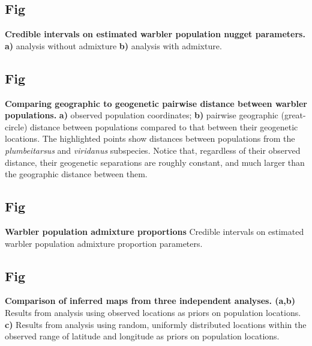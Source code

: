 \documentclass[10pt,letterpaper]{article}
\begin{document}
\subsection{Fig}
\label{sfig:warb_pop_nugg}
{\bf{
Credible intervals on estimated warbler population nugget parameters.}} 
\textbf{a)} analysis without admixture
\textbf{b)} analysis with admixture.

\subsection{Fig}
\label{sfig:warb_pop_distcomp}
{\bf{
Comparing geographic to geogenetic pairwise distance between warbler populations.}} 
\textbf{a)} 
	observed population coordinates; 
\textbf{b)} 
	pairwise geographic (great-circle) distance between populations 
	compared to that between their geogenetic locations.
The highlighted points show distances between populations 
from the \textit{plumbeitarsus} and \textit{viridanus} subspecies.  
Notice that, regardless of their observed distance, 
their geogenetic separations are roughly constant, 
and much larger than the geographic distance between them.

\subsection{Fig}
\label{sfig:warb_pop_adprop}
{\bf{Warbler population admixture proportions}}
Credible intervals on estimated warbler population admixture proportion parameters.

\subsection{Fig}
\label{sfig:warbler_pop_compare}
{\bf{
Comparison of inferred maps from three independent analyses.	}} 
\textbf{(a,b)} 
Results from analysis using observed locations as priors on population locations.  
\textbf{c)} 
Results from analysis using random, uniformly distributed locations 
within the observed range of latitude and longitude as priors on population locations.
\end{document}
